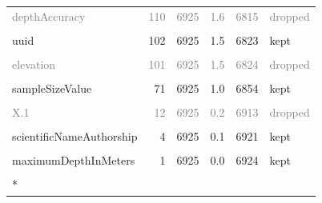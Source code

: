 \documentclass[sn-apa,pdflatex]{sn-jnl}
\begin{document}
\begin{longtable}[t]{lrrrrl}
\textcolor{gray}{depthAccuracy} & \textcolor{gray}{110} & \textcolor{gray}{6925} & \textcolor{gray}{1.6} & \textcolor{gray}{6815} & \textcolor{gray}{dropped}\\
\cellcolor{gray!10}{organismQuantity} & \cellcolor{gray!10}{109} & \cellcolor{gray!10}{6925} & \cellcolor{gray!10}{1.6} & \cellcolor{gray!10}{6816} & \cellcolor{gray!10}{kept}\\
\addlinespace
uuid & 102 & 6925 & 1.5 & 6823 & kept\\
\textcolor{gray}{\cellcolor{gray!10}{Identification}} & \textcolor{gray}{\cellcolor{gray!10}{102}} & \textcolor{gray}{\cellcolor{gray!10}{6925}} & \textcolor{gray}{\cellcolor{gray!10}{1.5}} & \textcolor{gray}{\cellcolor{gray!10}{6823}} & \textcolor{gray}{\cellcolor{gray!10}{dropped}}\\
\textcolor{gray}{elevation} & \textcolor{gray}{101} & \textcolor{gray}{6925} & \textcolor{gray}{1.5} & \textcolor{gray}{6824} & \textcolor{gray}{dropped}\\
\textcolor{gray}{\cellcolor{gray!10}{elevationAccuracy}} & \textcolor{gray}{\cellcolor{gray!10}{101}} & \textcolor{gray}{\cellcolor{gray!10}{6925}} & \textcolor{gray}{\cellcolor{gray!10}{1.5}} & \textcolor{gray}{\cellcolor{gray!10}{6824}} & \textcolor{gray}{\cellcolor{gray!10}{dropped}}\\
sampleSizeValue & 71 & 6925 & 1.0 & 6854 & kept\\
\addlinespace
\textcolor{gray}{\cellcolor{gray!10}{X}} & \textcolor{gray}{\cellcolor{gray!10}{13}} & \textcolor{gray}{\cellcolor{gray!10}{6925}} & \textcolor{gray}{\cellcolor{gray!10}{0.2}} & \textcolor{gray}{\cellcolor{gray!10}{6912}} & \textcolor{gray}{\cellcolor{gray!10}{dropped}}\\
\textcolor{gray}{X.1} & \textcolor{gray}{12} & \textcolor{gray}{6925} & \textcolor{gray}{0.2} & \textcolor{gray}{6913} & \textcolor{gray}{dropped}\\
\cellcolor{gray!10}{coordinatePrecision} & \cellcolor{gray!10}{9} & \cellcolor{gray!10}{6925} & \cellcolor{gray!10}{0.1} & \cellcolor{gray!10}{6916} & \cellcolor{gray!10}{kept}\\
scientificNameAuthorship & 4 & 6925 & 0.1 & 6921 & kept\\
\cellcolor{gray!10}{organismID} & \cellcolor{gray!10}{2} & \cellcolor{gray!10}{6925} & \cellcolor{gray!10}{0.0} & \cellcolor{gray!10}{6923} & \cellcolor{gray!10}{kept}\\
\addlinespace
maximumDepthInMeters & 1 & 6925 & 0.0 & 6924 & kept\\
\cellcolor{gray!10}{minimumDepthInMeters} & \cellcolor{gray!10}{1} & \cellcolor{gray!10}{6925} & \cellcolor{gray!10}{0.0} & \cellcolor{gray!10}{6924} & \cellcolor{gray!10}{kept}\\*
\end{longtable}
\endgroup{}
\end{document}
